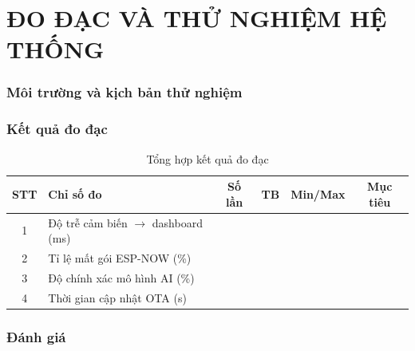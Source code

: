 \chapter{ĐO ĐẠC VÀ THỬ NGHIỆM HỆ THỐNG}
\subsection{Môi trường và kịch bản thử nghiệm}

\subsection{Kết quả đo đạc}

\begin{table}[H]\centering\caption{Tổng hợp kết quả đo đạc}
\begin{tabularx}{\linewidth}{|c|X|c|c|c|c|}
\hline STT & Chỉ số đo & Số lần & TB & Min/Max & Mục tiêu \\ \hline
1 & Độ trễ cảm biến $\rightarrow$ dashboard (ms) & \todo{…} & \todo{…} & \todo{…} & \todo{…} \\ \hline
2 & Tỉ lệ mất gói ESP-NOW (\%) & \todo{…} & \todo{…} & \todo{…} & \todo{…} \\ \hline
3 & Độ chính xác mô hình AI (\%) & \todo{…} & \todo{…} & \todo{…} & \todo{…} \\ \hline
4 & Thời gian cập nhật OTA (s) & \todo{…} & \todo{…} & \todo{…} & \todo{…} \\ \hline
\end{tabularx}
\end{table}

\subsection{Đánh giá}

